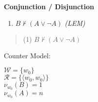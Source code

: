 
\noindent \textbf{Conjunction / Disjunction}

\begin{enumerate}
\item $ B\nvdash  (A \vee  \neg A) $ \emph{ (LEM)}  
\end{enumerate}





\bigskip
\begin{quote} 
(1) $ B\nvdash  (A \vee  \neg A) $
\end{quote} 
\bigskip

\bigskip

Counter Model: 

\bigskip
\noindent $\mathcal{W} = \{ w_0\} $\\
$\mathcal{R} = \{ \langle w_0,w_0 \rangle \} $\\
$ \mathcal{\nu}_{w_0}(B)=1 $ \\
$ \mathcal{\nu}_{w_0}(A)=n $ \\
\bigskip

